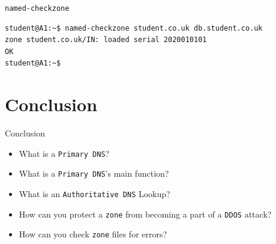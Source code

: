\documentclass[aspectratio=169,xcolor=table]{beamer}
\begin{document}
\begin{frame}[fragile]{\texttt{named-checkzone}}
  \begin{tcolorbox}
    \lstset{
      basicstyle=\tiny\ttfamily,
    }
    \begin{lstlisting}
student@A1:~$ named-checkzone student.co.uk db.student.co.uk
zone student.co.uk/IN: loaded serial 2020010101
OK
student@A1:~$
    \end{lstlisting}
  \end{tcolorbox}
\end{frame}

\section*{Conclusion}
\begin{frame}{Conclusion}
  \begin{itemize}
    \item What is a \texttt{Primary DNS}?
    \item What is a \texttt{Primary DNS}'s main function?
    \item What is an \texttt{Authoritative DNS} Lookup?
    \item How can you protect a \texttt{zone} from becoming a part of a \texttt{DDOS} attack?
    \item How can you check \texttt{zone} files for errors?
  \end{itemize}
\end{frame}
\end{document}
